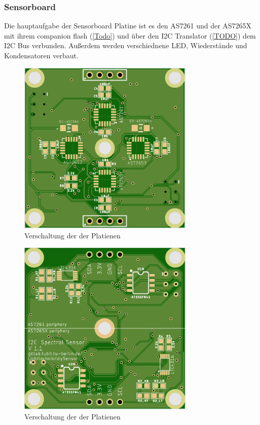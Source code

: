 \subsubsection{Sensorboard}
Die hauptaufgabe der Sensorboard Platine ist es den AS7261 und der AS7265X mit ihrem companion flash (\ref{Todo}) und über den I2C Translator (\ref{TODO}) dem I2C Bus verbunden.
Außerdem werden verschiednene LED, Wiederstände und Kondensatoren verbaut.

\begin{figure}[H]
\centering
\includegraphics[width=0.75\textwidth]{img/Sensor-platiene_front}
\caption{Verschaltung der der Platienen}
\label{fig:Seitenasicht-AS726X}
\end{figure}

\begin{figure}[H]
\centering
\includegraphics[width=0.75\textwidth]{img/Sensor-platiene_back}
\caption{Verschaltung der der Platienen}
\label{fig:Seitenasicht-AS726X}
\end{figure}

